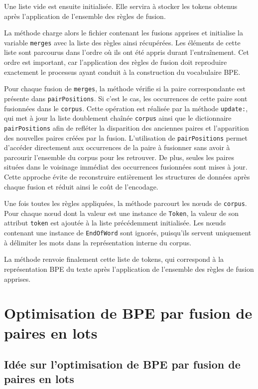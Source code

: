 \documentclass[12pt,a4paper]{report}
\begin{document}
	Une liste vide est ensuite initialisée. Elle servira à stocker les tokens obtenus après l'application de l'ensemble des règles de fusion.
	
	La méthode charge alors le fichier contenant les fusions apprises et initialise la variable \texttt{merges} avec la liste des règles ainsi récupérées. Les éléments de cette liste sont parcourus dans l'ordre où ils ont été appris durant l'entraînement. Cet ordre est important, car l'application des règles de fusion doit reproduire exactement le processus ayant conduit à la construction du vocabulaire BPE.
	
	Pour chaque fusion de \texttt{merges}, la méthode vérifie si la paire correspondante est présente dans \texttt{pairPositions}. Si c'est le cas, les occurrences de cette paire sont fusionnées dans le \texttt{corpus}. Cette opération est réalisée par la méthode \texttt{update:}, qui met à jour la liste doublement chaînée \texttt{corpus} ainsi que le dictionnaire \texttt{pairPositions} afin de refléter la disparition des anciennes paires et l'apparition des nouvelles paires créées par la fusion. L'utilisation de \texttt{pairPositions} permet d'accéder directement aux occurrences de la paire à fusionner sans avoir à parcourir l'ensemble du corpus pour les retrouver. De plus, seules les paires situées dans le voisinage immédiat des occurrences fusionnées sont mises à jour. Cette approche évite de reconstruire entièrement les structures de données après chaque fusion et réduit ainsi le coût de l'encodage.
	
	Une fois toutes les règles appliquées, la méthode parcourt les nœuds de \texttt{corpus}. Pour chaque nœud dont la valeur est une instance de \texttt{Token}, la valeur de son attribut \texttt{token} est ajoutée à la liste précédemment initialisée. Les nœuds contenant une instance de \texttt{EndOfWord} sont ignorés, puisqu'ils servent uniquement à délimiter les mots dans la représentation interne du corpus.
	
	La méthode renvoie finalement cette liste de tokens, qui correspond à la représentation BPE du texte après l'application de l'ensemble des règles de fusion apprises.
	
	\section{Optimisation de BPE par fusion de paires en lots}
	
	\subsection{Idée sur l'optimisation de BPE par fusion de paires en lots}
	
\end{document}
